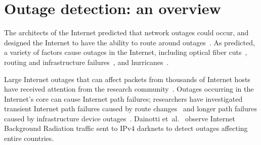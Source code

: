 



\section{Outage detection: an overview}

The architects of the Internet predicted that network outages could
occur, and designed the Internet to have the ability to route around
outages~\cite{clark-darpa}. As predicted, a variety of factors cause
outages in the Internet, including optical fiber
cuts~\cite{fiber-cuts}, routing and infrastructure
failures~\cite{backbone-failures-1999, ratulbgp}, and
hurricanes~\cite{pingin}.


Large Internet outages that can affect packets from thousands of
Internet hosts have received attention from the research
community~\cite{censorship-outages, trinocular, hubble, paxson-e2e,
hubble, netdiagnoser, lifeguard, poiroot,
phillipa-outages-mailing-list, california-fault-lines,
delayed-routing-convergence, consensus-routing, routing-e2e-path-perf,
voip-bgp-convergence}. Outages occurring in the Internet's core can
cause Internet path failures; researchers have investigated transient
Internet path failures caused by route
changes~\cite{delayed-routing-convergence, consensus-routing,
routing-e2e-path-perf, voip-bgp-convergence} and longer path failures
caused by infrastructure device outages~\cite{paxson-e2e, hubble,
netdiagnoser, lifeguard, poiroot, phillipa-outages-mailing-list,
california-fault-lines}. Dainotti et~al.~\cite{dainotti-imc11} observe
Internet Background Radiation traffic sent to IPv4 darknets to detect
outages affecting entire countries.


